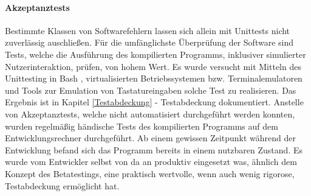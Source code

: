 \paragraph{Akzeptanztests}
Bestimmte Klassen von Softwarefehlern lassen sich allein mit Unittests nicht
zuverlässig auschließen. Für die umfänglichste Überprüfung der Software sind
Tests, welche die Ausführung des kompilierten Programms, inklusiver simulierter
Nutzerinteraktion, prüfen, von hohem Wert. Es wurde versucht mit Mitteln des
Unittesting in Bash \cite{bats} , virtualisierten Betriebssystemen \cite{virtualbox} \cite{docker}
bzw. \gls{Terminalemulator}en und Tools zur Emulation von Tastatureingaben \cite{xdotool} \cite{ydotool}
solche Test zu realisieren. Das Ergebnis ist in Kapitel
\ref{Testabdeckung} - Testabdeckung dokumentiert. Anstelle von Akzeptanztests,
welche nicht automatisiert durchgeführt werden konnten, wurden regelmäßig händische
Tests des kompilierten Programms auf dem Entwicklungsrechner durchgeführt. Ab einem
gewissen Zeitpunkt während der Entwicklung befand sich das Programm bereits in einem nutzbaren
Zustand. Es wurde vom Entwickler selbst von da an produktiv eingesetzt was,
ähnlich dem Konzept des \gls{Betatesting}s, eine praktisch wertvolle, wenn auch wenig rigorose,
Testabdeckung ermöglicht hat.